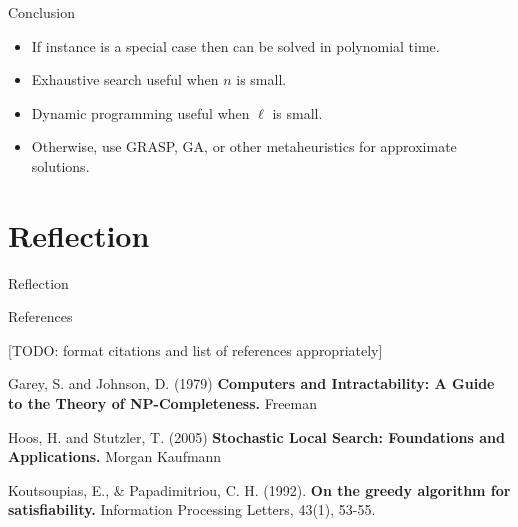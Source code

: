 \documentclass[aspectratio=169, compress, xcolor=table,xcolor=dvipsnames]{beamer}
\begin{document}
\begin{frame}
{Conclusion}

\begin{itemize}
	\item If instance is a special case then can be solved in polynomial time.
	\item Exhaustive search useful when $n$ is small.
	\item Dynamic programming useful when $\ell$ is small.
	\item Otherwise, use GRASP, GA, or other metaheuristics for approximate solutions.
\end{itemize}
\end{frame}
%
%

\section{Reflection}

\begin{frame}
	{Reflection}

\end{frame}

\begin{frame}
{References}
		
		[TODO: format citations and list of references appropriately]
		
	
	\begin{thebibliography}{References}
		\beamertemplatebookbibitems
		Garey, S. and Johnson, D. (1979)
		\textbf{Computers and Intractability: A Guide to the Theory of NP-Completeness.}
		Freeman

		Hoos, H. and Stutzler, T. (2005)
		\textbf{Stochastic Local Search: Foundations and Applications.}
		Morgan Kaufmann
		
		Koutsoupias, E., \& Papadimitriou, C. H. (1992). \textbf{On the greedy algorithm for satisfiability.} Information Processing Letters, 43(1), 53-55.
				
	\end{thebibliography}
	
\end{frame}
\end{document}
